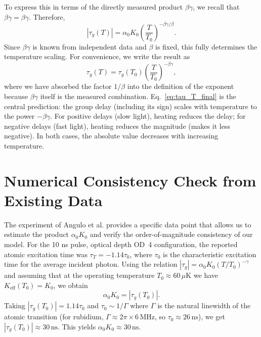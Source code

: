 \documentclass[12pt,a4paper]{article}
\newcommand{\Keff}{K_{\mathrm{eff}}}
\newcommand{\betagamma}{\beta\gamma}
\newcommand{\betac}{\beta}
\begin{document}
	To express this in terms of the directly measured product \(\betagamma\), we recall that \(\betagamma = \betac \gamma\). Therefore,
	\begin{equation}
		|\tau_g(T)| = \alpha_0 K_0 \left(\frac{T}{T_0}\right)^{-\betagamma / \betac}.
	\end{equation}
	Since \(\betagamma\) is known from independent data and \(\betac\) is fixed, this fully determines the temperature scaling. For convenience, we write the result as
	\begin{equation}
		\tau_g(T) = \tau_g(T_0) \left(\frac{T}{T_0}\right)^{-\betagamma},
		\label{eq:tau_T_final}
	\end{equation}
	where we have absorbed the factor \(1/\betac\) into the definition of the exponent because \(\betagamma\) itself is the measured combination. Eq.~\eqref{eq:tau_T_final} is the central prediction: the group delay (including its sign) scales with temperature to the power \(-\betagamma\). For positive delays (slow light), heating reduces the delay; for negative delays (fast light), heating reduces the magnitude (makes it less negative). In both cases, the absolute value decreases with increasing temperature.
	
	\section{Numerical Consistency Check from Existing Data}
	
	The experiment of Angulo et al. \cite{Angulo2024} provides a specific data point that allows us to estimate the product \(\alpha_0 K_0\) and verify the order-of-magnitude consistency of our model. For the 10 ns pulse, optical depth OD~4 configuration, the reported atomic excitation time was \(\tau_T = -1.14 \tau_0\), where \(\tau_0\) is the characteristic excitation time for the average incident photon. Using the relation \(|\tau_g| = \alpha_0 K_0 (T/T_0)^{-\gamma}\) and assuming that at the operating temperature \(T_0 \approx 60\,\mu\mathrm{K}\) we have \(\Keff(T_0) = K_0\), we obtain
	\begin{equation}
		\alpha_0 K_0 = |\tau_g(T_0)|.
	\end{equation}
	Taking \(|\tau_g(T_0)| = 1.14 \tau_0\) and \(\tau_0 \sim 1/\Gamma\) where \(\Gamma\) is the natural linewidth of the atomic transition (for rubidium, \(\Gamma \approx 2\pi \times 6\,\mathrm{MHz}\), so \(\tau_0 \approx 26\,\mathrm{ns}\)), we get \(|\tau_g(T_0)| \approx 30\,\mathrm{ns}\). This yields \(\alpha_0 K_0 \approx 30\,\mathrm{ns}\).
	
\end{document}
